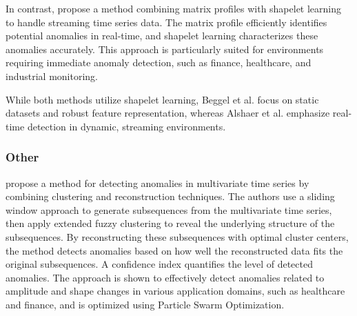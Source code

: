 In contrast, \cite{alshaer_detecting_2020} propose a method combining matrix profiles with shapelet learning to handle streaming time series data. The matrix profile efficiently identifies potential anomalies in real-time, and shapelet learning characterizes these anomalies accurately. This approach is particularly suited for environments requiring immediate anomaly detection, such as finance, healthcare, and industrial monitoring.

While both methods utilize shapelet learning, Beggel et al. focus on static datasets and robust feature representation, whereas Alshaer et al. emphasize real-time detection in dynamic, streaming environments.

\cite{liang_shapelet-based_2024}

\cite{li_ips_2022}

\subsubsection{Other}
\cite{li_clustering-based_2021} propose a method for detecting anomalies in multivariate time series by combining clustering and reconstruction techniques. The authors use a sliding window approach to generate subsequences from the multivariate time series, then apply extended fuzzy clustering to reveal the underlying structure of the subsequences. By reconstructing these subsequences with optimal cluster centers, the method detects anomalies based on how well the reconstructed data fits the original subsequences. A confidence index quantifies the level of detected anomalies. The approach is shown to effectively detect anomalies related to amplitude and shape changes in various application domains, such as healthcare and finance, and is optimized using Particle Swarm Optimization.


\cite{niu_lstm-based_2020}
\cite{duan_unsupervised_2021}
